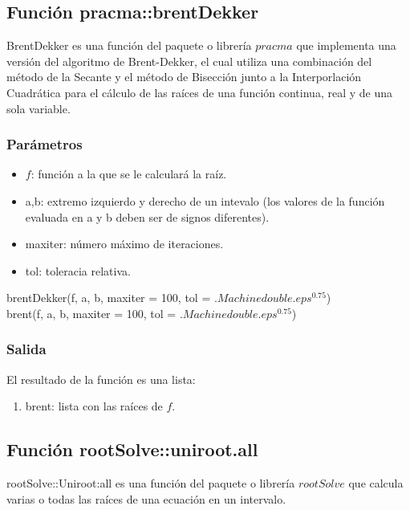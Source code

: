 \documentclass[a4paper,12pt]{article}
\begin{document}
\subsection{Función pracma::brentDekker}

BrentDekker es una función del paquete o librería $pracma$ que implementa una versión del algoritmo de Brent-Dekker, el cual utiliza una combinación del método de la Secante y el método de Bisección junto a la Interporlación Cuadrática para el cálculo de las raíces de una función continua, real y de una sola variable.


\subsubsection{Parámetros}

\begin{itemize}
    \item $f$: función a la que se le calculará la raíz.
    \item a,b: extremo izquierdo y derecho de un intevalo (los valores de la función evaluada en a y b deben ser de signos diferentes).
    \item maxiter: número máximo de iteraciones.
    \item tol: toleracia relativa.
\end{itemize}

brentDekker(f, a, b, maxiter = 100, tol = $.Machinedouble.eps^0.75$) \\
brent(f, a, b, maxiter = 100, tol = $.Machinedouble.eps^0.75$)

\subsubsection{Salida}

El resultado de la función es una lista:
\begin{enumerate}
    \item brent: lista con las raíces de $f$.
\end{enumerate}

\subsection{Función rootSolve::uniroot.all}
rootSolve::Uniroot:all es una función del paquete o librería $rootSolve$ que calcula varias o todas las raíces de una ecuación en un intervalo.
\end{document}
